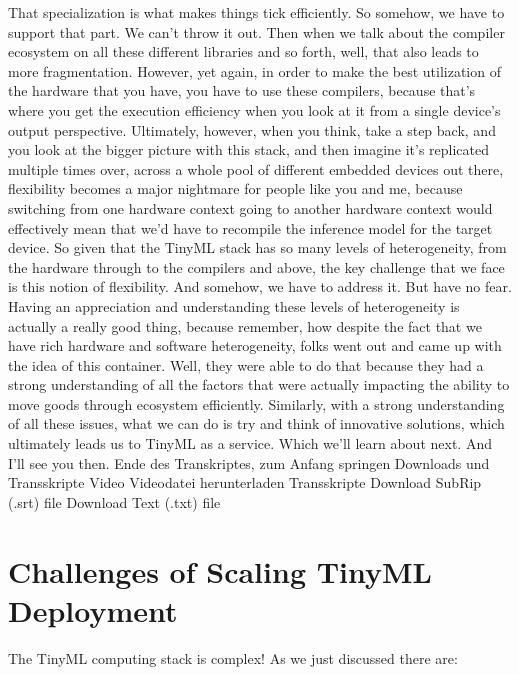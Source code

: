 {{{{{     That specialization is what makes things tick efficiently.
     So somehow, we have to support that part.
     We can't throw it out.
     Then when we talk about the compiler ecosystem
     on all these different libraries and so forth,
     well, that also leads to more fragmentation.
     However, yet again, in order to make the best utilization of the hardware
     that you have, you have to use these compilers,
     because that's where you get the execution
     efficiency when you look at it from a single device's output perspective.
     Ultimately, however, when you think, take a step back,
     and you look at the bigger picture with this stack,
     and then imagine it's replicated multiple times over,
     across a whole pool of different embedded devices out there,
     flexibility becomes a major nightmare for people like you and me,
     because switching from one hardware context going to another hardware
     context would effectively mean that we'd have
     to recompile the inference model for the target device.
     So given that the TinyML stack has so many levels of heterogeneity,
     from the hardware through to the compilers and above,
     the key challenge that we face is this notion of flexibility.
     And somehow, we have to address it.
     But have no fear.
     Having an appreciation and understanding these levels of heterogeneity
     is actually a really good thing, because remember,
     how despite the fact that we have rich hardware and software heterogeneity,
     folks went out and came up with the idea of this container.
     Well, they were able to do that because they had a strong understanding of all
     the factors that were actually impacting the ability to move goods
     through ecosystem efficiently.
     Similarly, with a strong understanding of all these issues, what we can do is
     try and think of innovative solutions, which ultimately leads us
     to TinyML as a service.
     Which we'll learn about next.
     And I'll see you then.
     Ende des Transkriptes, zum Anfang springen
     Downloads und Transskripte
     Video
     Videodatei herunterladen
     Transskripte
     Download SubRip (.srt) file
     Download Text (.txt) file
 
 \section{Challenges of Scaling TinyML Deployment}
 
 The TinyML computing stack is complex! As we just discussed there are:
 
}}}}}
